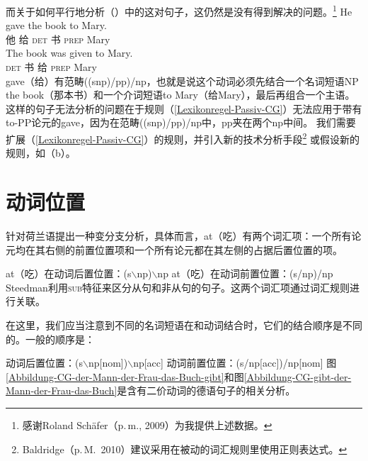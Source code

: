 \noindent
而关于如何平行地分析（）中的这对句子，这仍然是没有得到解决的问题。\footnote{%
  感谢Roland Sch\"{a}fer（p.\,m., 2009）为我提供上述数据。
}
\eal
\ex 
\gll He gave the book to Mary.\\
他 给 \textsc{det} 书 \textsc{prep} Mary\\
\ex 
\gll The book was given to Mary.\\
\textsc{det} 书  \passivepst{} 给 \textsc{prep} Mary\\
\zl
gave（给）有范畴((s\bs np)/pp)/np，也就是说这个动词必须先结合一个名词短语NP the book（那本书）和一个介词短语to Mary（给Mary），最后再组合一个主语。
这样的句子无法分析的问题在于规则（\ref{Lexikonregel-Passiv-CG}）无法应用于带有to-PP论元的gave，因为在范畴((s\bs np)/pp)/np中，pp夹在两个np中间。
我们需要扩展（\ref{Lexikonregel-Passiv-CG}）的规则，并引入新的技术分析手段\footnote{%
  Baldridge（p.\,M.\ 2010）建议采用在被动的词汇规则里使用正则表达式。
 }
或假设新的规则，如（b）。

\section{动词位置}
\label{sec-Verbstellung-CG-Steedman}

\mbox{} \citet[]{Steedman2000a-u}
针对荷兰语提出一种变分支分析，具体而言，at（吃）有两个词汇项：一个所有论元均在其右侧的前置位置项和一个所有论元都在其左侧的占据后置位置的项。

\eal
\ex at（吃）在动词后置位置：(s$\backslash$np)$\backslash$np
\ex at（吃）在动词前置位置：(s/np)/np
\zl
Steedman利用\textsc{sub}特征来区分从句和非从句的句子。这两个词汇项通过词汇规则进行关联。

在这里，我们应当注意到不同的名词短语在和动词结合时，它们的结合顺序是不同的。一般的顺序是：

\eal
\label{CG-Verbbewegung}
\ex 动词后置位置：(s$\backslash$np[nom])$\backslash$np[acc]
\ex 动词前置位置：(s/np[acc])/np[nom]
\zl
图\ref{Abbildung-CG-der-Mann-der-Frau-das-Buch-gibt}和图\ref{Abbildung-CG-gibt-der-Mann-der-Frau-das-Buch}是含有二价动词的德语句子的相关分析。

